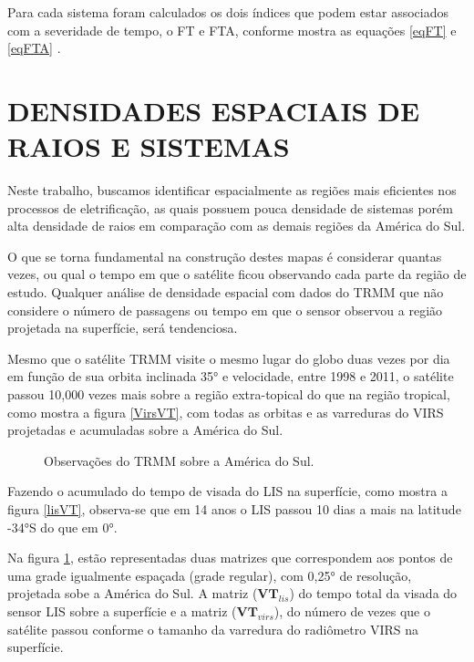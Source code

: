 Para cada sistema foram calculados os dois índices que podem estar associados com a severidade de tempo, o FT e FTA, conforme mostra as equações \ref{eqFT} e \ref{eqFTA} 
 .

\section{DENSIDADES ESPACIAIS DE RAIOS E SISTEMAS}
\label{metodoPass}

Neste trabalho, buscamos identificar espacialmente as regiões mais eficientes nos processos de eletrificação, as quais possuem pouca densidade de sistemas porém alta densidade de raios em comparação com as demais regiões da América do Sul.

O que se torna fundamental na construção destes mapas é considerar quantas vezes, ou qual o tempo em que o satélite ficou observando cada parte da região de estudo. Qualquer análise de densidade espacial com dados do TRMM que não considere o número de passagens ou tempo em que o sensor observou a região projetada na superfície, será tendenciosa.

Mesmo que o satélite TRMM visite o mesmo lugar do globo duas vezes por dia em função de sua orbita inclinada 35° e velocidade, entre 1998 e 2011, o satélite passou 10,000 vezes mais sobre a região extra-topical do que na região tropical, como mostra a figura \ref{VirsVT}, com todas as orbitas e as varreduras do VIRS projetadas e acumuladas sobre a América do Sul. 

\begin{figure}[!ht]

\caption{Observações do TRMM sobre a América do Sul.}
\label{gridVT} 
\end{figure} 

Fazendo o acumulado do tempo de visada do LIS na superfície, como mostra a figura \ref{lisVT}, observa-se que em 14 anos o LIS passou 10 dias a mais na latitude -34°S do que em 0°.

Na figura \ref{gridVT}, estão representadas duas matrizes que correspondem aos pontos de uma grade igualmente espaçada (grade regular), com 0,25° de resolução, projetada sobe a América do Sul. A matriz ($\mathbf{VT}_{lis}$) do tempo total da visada do sensor LIS sobre a superfície e a matriz ($\mathbf{VT}_{virs}$), do número de vezes que o satélite passou conforme o tamanho da varredura do radiômetro VIRS na superfície.  

